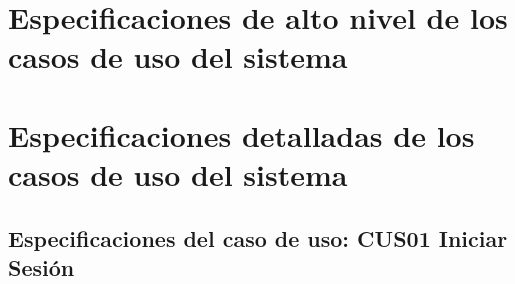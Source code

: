 \section{Especificaciones de alto nivel de los casos de uso del sistema}

\section{Especificaciones detalladas de los casos de uso del sistema}

\subsection{Especificaciones del caso de uso: CUS01 Iniciar Sesión}
